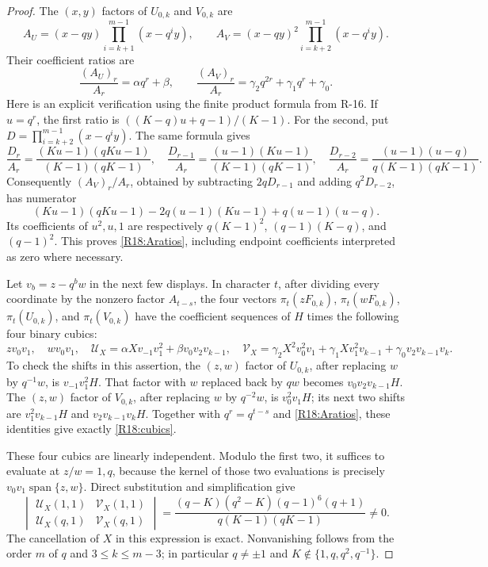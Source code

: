 \begin{proof}
The $(x,y)$ factors of $U_{0,k}$ and $V_{0,k}$ are
\[
 A_U=(x-qy)\prod_{i=k+1}^{m-1}(x-q^iy),\qquad
 A_V=(x-qy)^2\prod_{i=k+2}^{m-1}(x-q^iy).
\]
Their coefficient ratios are
\begin{equation}\label{R18:Aratios}
 \frac{(A_U)_r}{A_r}=\alpha q^r+\beta,
 \qquad
 \frac{(A_V)_r}{A_r}
    =\gamma_2 q^{2r}+\gamma_1 q^r+\gamma_0.
\end{equation}
Here is an explicit verification using the finite product
formula from R-16. If $u=q^r$, the first ratio is
$((K-q)u+q-1)/(K-1)$. For the second, put
$D=\prod_{i=k+2}^{m-1}(x-q^iy)$.
The same formula gives
\[
 \frac{D_r}{A_r}
  =\frac{(Ku-1)(qKu-1)}{(K-1)(qK-1)},\quad
 \frac{D_{r-1}}{A_r}
  =\frac{(u-1)(Ku-1)}{(K-1)(qK-1)},\quad
 \frac{D_{r-2}}{A_r}
  =\frac{(u-1)(u-q)}{q(K-1)(qK-1)}.
\]
Consequently $(A_V)_r/A_r$, obtained by subtracting
$2qD_{r-1}$ and adding $q^2D_{r-2}$, has numerator
\[
 (Ku-1)(qKu-1)-2q(u-1)(Ku-1)+q(u-1)(u-q).
\]
Its coefficients of $u^2,u,1$ are respectively
$q(K-1)^2$, $(q-1)(K-q)$, and $(q-1)^2$.
This proves \eqref{R18:Aratios}, including endpoint
coefficients interpreted as zero where necessary.

Let $v_b=z-q^bw$ in the next few displays. In character
$t$, after dividing every coordinate by the nonzero factor
$A_{t-s}$, the four vectors
$\pi_t(zF_{0,k})$, $\pi_t(wF_{0,k})$,
$\pi_t(U_{0,k})$, and $\pi_t(V_{0,k})$ have the coefficient
sequences of $H$ times the following four binary cubics:
\begin{equation}\label{R18:cubics}
 zv_0v_1,\quad wv_0v_1,\quad
 \mathcal U_X=\alpha Xv_{-1}v_1^2+\beta v_0v_2v_{k-1},\quad
 \mathcal V_X=\gamma_2X^2v_0^2v_1
               +\gamma_1Xv_1^2v_{k-1}
               +\gamma_0v_2v_{k-1}v_k.
\end{equation}
To check the shifts in this assertion, the $(z,w)$ factor
of $U_{0,k}$, after replacing $w$ by $q^{-1}w$, is
$v_{-1}v_1^2H$. That factor with $w$ replaced back by
$qw$ becomes $v_0v_2v_{k-1}H$.
The $(z,w)$ factor of $V_{0,k}$, after replacing $w$ by
$q^{-2}w$, is $v_0^2v_1H$; its next two shifts are
$v_1^2v_{k-1}H$ and $v_2v_{k-1}v_kH$.
Together with $q^r=q^{t-s}$ and
\eqref{R18:Aratios}, these identities give exactly
\eqref{R18:cubics}.

These four cubics are linearly independent. Modulo the
first two, it suffices to evaluate at $z/w=1,q$, because
the kernel of those two evaluations is precisely
$v_0v_1\operatorname{span}\{z,w\}$.
Direct substitution and simplification give
\begin{equation}\label{R18:evaldet}
 \begin{vmatrix}
 \mathcal U_X(1,1)&\mathcal V_X(1,1)\\
 \mathcal U_X(q,1)&\mathcal V_X(q,1)
 \end{vmatrix}
 =\frac{(q-K)(q^2-K)(q-1)^6(q+1)}
        {q(K-1)(qK-1)}\ne0.
\end{equation}
The cancellation of $X$ in this expression is exact.
Nonvanishing follows from the order $m$ of $q$ and
$3\leq k\leq m-3$; in particular $q\ne\pm1$ and
$K\notin\{1,q,q^2,q^{-1}\}$.


\end{proof}

